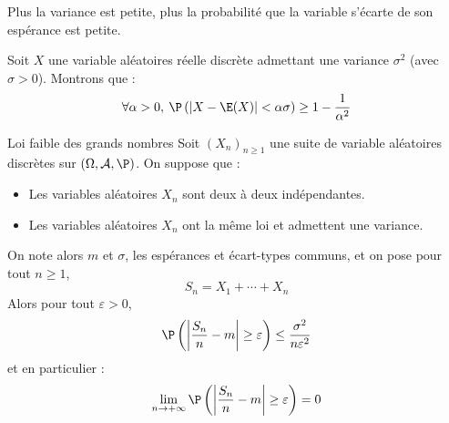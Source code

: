\documentclass[french,11pt,twoside]{VcCours}
\begin{document}
\begin{Remarque}{} Plus la variance est petite, plus la probabilité que la variable s'écarte de son espérance est petite.
\end{Remarque}

\begin{Exemple}{} Soit $X$ une variable aléatoires réelle discrète admettant une variance $\sigma^{2}$ (avec $\sigma > 0$). Montrons que :
  \[
  \forall \alpha > 0,\:\P\left(\vert X - \E(X) \vert < \alpha \sigma \right) \geq 1 - \frac{1}{\alpha^{2}}
  \]
  
 \vspace{5cm}
\end{Exemple}

\begin{Theoreme}{Loi faible des grands nombres} Soit $(X_n)_{n \geq 1}$ une suite de variable aléatoires discrètes sur $(\Omega, \mathcal{A}, \P)$. On suppose que :
\begin{itemize}
\item Les variables aléatoires $X_n$ sont deux à deux indépendantes.
\item Les variables aléatoires $X_n$ ont la même loi et admettent une variance.
\end{itemize}
On note alors $m$ et $\sigma$, les espérances et écart-types communs, et on pose pour tout $n \geq 1$,
$$ S_n = X_1 + \cdots + X_n$$
Alors pour tout $\varepsilon>0$,
$$ \P \left( \left\vert \dfrac{S_n}{n}-m \right\vert  \geq \varepsilon \right) \leq \dfrac{\sigma^2}{n \varepsilon^2}$$
et en particulier :
$$ \lim_{n \rightarrow + \infty} \P \left( \left\vert \dfrac{S_n}{n}-m \right\vert  \geq \varepsilon \right) = 0$$
\end{Theoreme}

\begin{Demonstration}{}

\vspace{8cm}
\end{Demonstration}

\newpage

\phantom{test}
\end{document}

